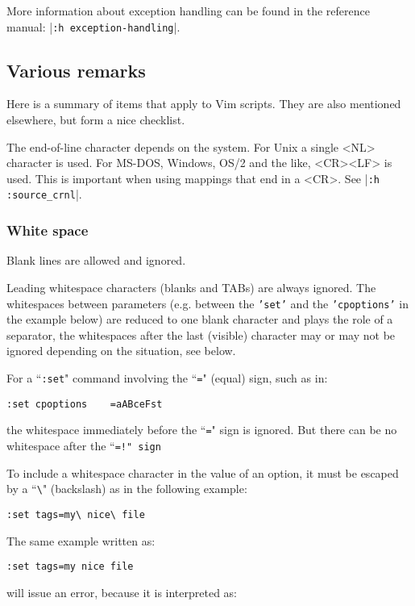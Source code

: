 More information about exception handling can be found in the reference manual: |\texttt{:h exception-handling}|.
\subsection{Various remarks}
Here is a summary of items that apply to Vim scripts.
They are also mentioned elsewhere, but form a nice checklist.

The end-of-line character depends on the system.
For Unix a single <NL> character is used.
For MS-DOS, Windows, OS/2 and the like, <CR><LF> is used.
This is important when using mappings that end in a <CR>.
See |\texttt{:h :source\_crnl}|.
\subsubsection{White space}
Blank lines are allowed and ignored.

Leading whitespace characters (blanks and TABs) are always ignored.
The whitespaces between parameters (e.g. between the \texttt{'set'} and the \texttt{'cpoptions'} in the example below) are reduced to one blank character and plays the role of a separator, the whitespaces after the last (visible) character may or may not be ignored depending on the situation, see below.

For a ``\texttt{:set}" command involving the ``\texttt{=}" (equal) sign, such as in:

\begin{Verbatim}[samepage=true]
 :set cpoptions    =aABceFst
\end{Verbatim}

the whitespace immediately before the ``\texttt{=}" sign is ignored.
But there can be no whitespace after the ``\texttt{=!" sign}

To include a whitespace character in the value of an option, it must be escaped by a ``\texttt{\textbackslash{}}" (backslash)  as in the following example:

\begin{Verbatim}[samepage=true]
 :set tags=my\ nice\ file
\end{Verbatim}

The same example written as:

\begin{Verbatim}[samepage=true]
 :set tags=my nice file
\end{Verbatim}

will issue an error, because it is interpreted as:

